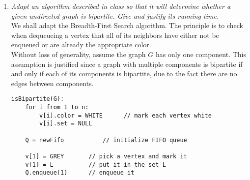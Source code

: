 \documentclass[12pt]{article}
\begin{document}
\begin{enumerate}
\begin{enumerate}
\begin{center}
            \end{center}
            \hspace{12pt}\\
            
            \item \textit{Adapt an algorithm described in class so that it will determine whether a given undirected graph is bipartite. Give and justify its running time.}\\
            
            We shall adapt the Breadth-First Search algorithm. The principle is to check when dequeueing a vertex that all of its neighbors have either not be enqueued or are already the appropriate color.\\
            
            Without loss of generality, assume the graph $G$ has only one component. This assumption is justified since a graph with multiple components is bipartite if and only if each of its components is bipartite, due to the fact there are no edges between components.\\
             
            \newpage
            \begin{small}
            \begin{verbatim}
isBipartite(G):
    for i from 1 to n:
        v[i].color = WHITE      // mark each vertex white
        v[i].set = NULL
    
    Q = newFifo           // initialize FIFO queue
    
    v[1] = GREY       // pick a vertex and mark it
    v[1] = L          // put it in the set L
    Q.enqueue(1)      // enqueue it
    

\end{verbatim}
\end{small}
\end{enumerate}
\end{enumerate}
\end{document}
